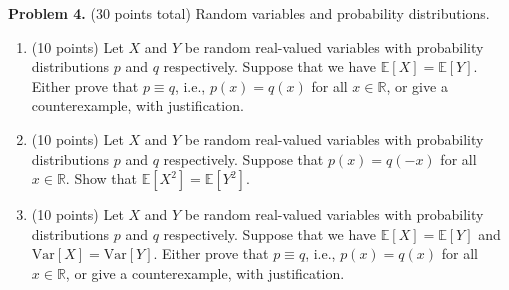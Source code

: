 \documentclass[11pt]{article}
\newcommand{\Ex}[1]{\ensuremath{\mathbb{E}\left[#1\right]}}
\newcommand{\Var}[1]{\ensuremath{\text{Var}\left[#1\right]}}
\begin{document}
\vskip 0.2in\noindent
\textbf{Problem 4.} (30 points total)
Random variables and probability distributions. 
\begin{enumerate}
\item (10 points)
Let $X$ and $Y$ be random real-valued variables with probability distributions $p$ and $q$ respectively. 
Suppose that we have $\Ex{X}=\Ex{Y}$. 
Either prove that $p\equiv q$, i.e., $p(x)=q(x)$ for all $x\in\mathbb{R}$, or give a counterexample, with justification. 
\item (10 points)
Let $X$ and $Y$ be random real-valued variables with probability distributions $p$ and $q$ respectively. 
Suppose that $p(x)=q(-x)$ for all $x\in\mathbb{R}$. 
Show that $\Ex{X^2}=\Ex{Y^2}$. 
\item (10 points)
Let $X$ and $Y$ be random real-valued variables with probability distributions $p$ and $q$ respectively. 
Suppose that we have $\Ex{X}=\Ex{Y}$ and $\Var{X}=\Var{Y}$. 
Either prove that $p\equiv q$, i.e., $p(x)=q(x)$ for all $x\in\mathbb{R}$, or give a counterexample, with justification. 
\end{enumerate}
\end{document}
